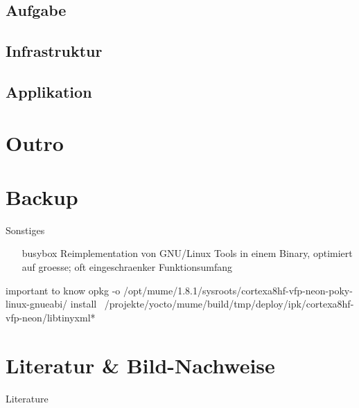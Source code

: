 \subsection{Aufgabe}

\subsection{Infrastruktur}

\subsection{Applikation}

\section{Outro}


{
\appendix

\section{Backup}



\begin{frame}{Sonstiges}
	\begin{itemize}
		\item[busybox] Reimplementation von GNU/Linux Tools in einem Binary, optimiert auf groesse; oft eingeschraenker Funktionsumfang
	\end{itemize}
\end{frame}

\begin{frame}{important to know}
opkg -o /opt/mume/1.8.1/sysroots/cortexa8hf-vfp-neon-poky-linux-gnueabi/ install ~/projekte/yocto/mume/build/tmp/deploy/ipk/cortexa8hf-vfp-neon/libtinyxml*
\end{frame}

\section{Literatur \& Bild-Nachweise}
\begin{frame}[allowframebreaks]{Literature}
	\tiny{
		
	}
\end{frame}

}


